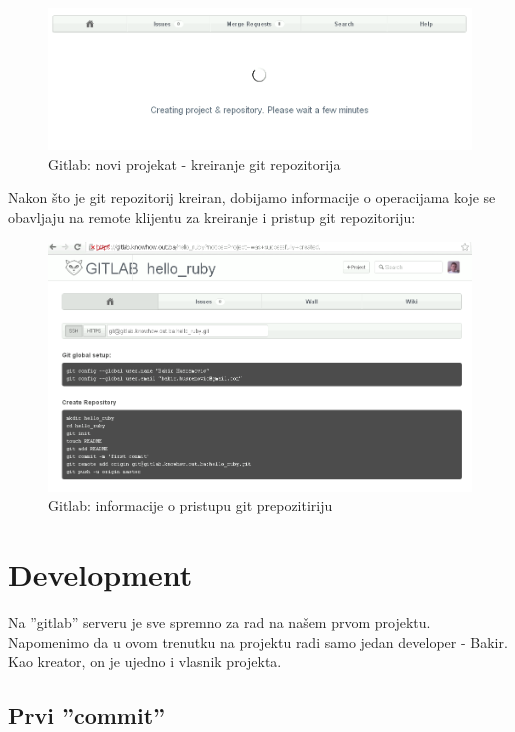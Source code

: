 \documentclass[times, utf8, seminar]{fit}
\begin{document}
\begin{figure}[H]
\centering
\includegraphics[width=15cm]{img/gitlab_new_project_2.png}
\caption{Gitlab: novi projekat - kreiranje git repozitorija}
\end{figure}

Nakon što je git repozitorij kreiran, dobijamo informacije o operacijama koje se obavljaju na remote klijentu za kreiranje i pristup git repozitoriju:

\begin{figure}[H]
\centering
\includegraphics[width=15cm]{img/gitlab_new_project_3.png}
\caption{Gitlab: informacije o pristupu git prepozitiriju}
\end{figure}

\section{Development}

Na ''gitlab'' serveru je sve spremno za rad na našem prvom projektu. Napomenimo da u ovom trenutku na projektu radi samo jedan developer - Bakir. Kao kreator, on je ujedno i vlasnik projekta.

\subsection{Prvi ''commit''}
\end{document}
